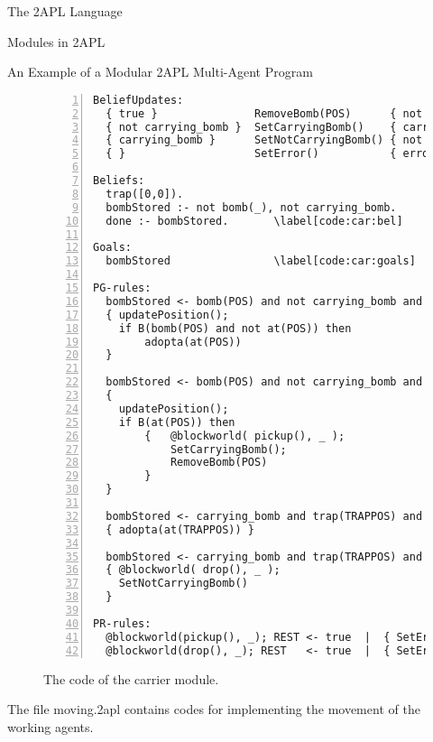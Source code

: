 \begin{chapter}{The 2APL Language}
\begin{section}{Modules in 2APL}
\begin{subsection}{An Example of a Modular 2APL Multi-Agent Program}
\begin{figure}[H]
\begin{Verbatim}[frame=single,numbers=left,firstnumber=last,
                 numbersep=2pt,commandchars=\\\[\]]
BeliefUpdates:
  { true }               RemoveBomb(POS)      { not bomb(POS) }
  { not carrying_bomb }  SetCarryingBomb()    { carrying_bomb }
  { carrying_bomb }      SetNotCarryingBomb() { not carrying_bomb }
  { }                    SetError()           { error }

Beliefs:
  trap([0,0]).
  bombStored :- not bomb(_), not carrying_bomb.
  done :- bombStored.       \label[code:car:bel]

Goals:
  bombStored                \label[code:car:goals]

PG-rules:
  bombStored <- bomb(POS) and not carrying_bomb and not at(POS) | \label[code:car:begr1]
  { updatePosition();
    if B(bomb(POS) and not at(POS)) then
        adopta(at(POS))
  }                                                             \label[code:car:endr1]

  bombStored <- bomb(POS) and not carrying_bomb and at(POS) |   \label[code:car:begr2]
  {
    updatePosition();
    if B(at(POS)) then
        {   @blockworld( pickup(), _ );
            SetCarryingBomb();
            RemoveBomb(POS)
        }
  }                                                             \label[code:car:endr2]

  bombStored <- carrying_bomb and trap(TRAPPOS) and not at(TRAPPOS) |  \label[code:car:r3]
  { adopta(at(TRAPPOS)) }

  bombStored <- carrying_bomb and trap(TRAPPOS) and at(TRAPPOS) | \label[code:car:r4]
  { @blockworld( drop(), _ );
    SetNotCarryingBomb()
  }

PR-rules:
  @blockworld(pickup(), _); REST <- true  |  { SetError() } \label[code:car:pr1]
  @blockworld(drop(), _); REST   <- true  |  { SetError() } \label[code:car:pr2]
\end{Verbatim}
\caption{The code of the carrier module.}\label{fig:carriercode}
\end{figure}

The file \ttt moving.2apl \ttt contains codes for implementing the
movement of the working agents.
\end{subsection}

\end{section}

\end{chapter}
